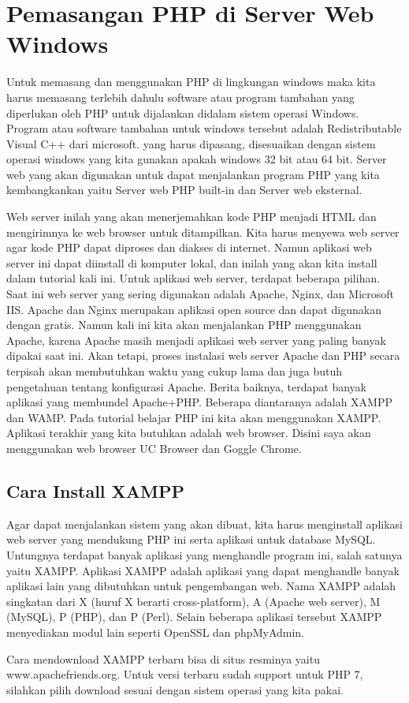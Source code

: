 \section{Pemasangan PHP di Server Web Windows}
Untuk memasang dan menggunakan PHP di lingkungan windows maka kita harus memasang terlebih dahulu software atau program tambahan yang diperlukan oleh PHP untuk dijalankan didalam sistem operasi Windows. Program atau software tambahan untuk windows tersebut adalah Redistributable Visual C++ dari microsoft. yang harus dipasang, disesuaikan dengan sistem operasi windows yang kita gunakan apakah windows 32 bit atau 64 bit. Server web yang akan digunakan untuk dapat menjalankan program PHP yang kita kembangkankan yaitu Server web PHP built-in dan Server web eksternal. 
\par
Web server inilah yang akan menerjemahkan kode PHP menjadi HTML dan mengirimnya ke web browser untuk ditampilkan. Kita harus menyewa web server agar kode PHP dapat diproses dan diakses di internet. Namun aplikasi web server ini dapat diinstall di komputer lokal, dan inilah yang akan kita install dalam tutorial kali ini. Untuk aplikasi web server, terdapat beberapa pilihan. Saat ini web server yang sering digunakan adalah Apache, Nginx, dan Microsoft IIS. Apache dan Nginx merupakan aplikasi open source dan dapat digunakan dengan gratis. Namun kali ini kita akan menjalankan PHP menggunakan Apache, karena Apache masih menjadi aplikasi web server yang paling banyak dipakai saat ini. Akan tetapi, proses instalasi web server Apache dan PHP secara terpisah akan membutuhkan waktu yang cukup lama dan juga butuh pengetahuan tentang konfigurasi Apache. Berita baiknya, terdapat banyak aplikasi yang membundel Apache+PHP. Beberapa diantaranya adalah XAMPP dan WAMP. Pada tutorial belajar PHP ini kita akan menggunakan XAMPP. Aplikasi terakhir yang kita butuhkan adalah web browser. Disini saya akan menggunakan web browser UC Browser dan Goggle Chrome.

\subsection{Cara Install XAMPP}
Agar dapat menjalankan sistem yang akan dibuat, kita harus menginstall aplikasi web server yang mendukung PHP ini serta aplikasi untuk database MySQL. Untungnya terdapat banyak aplikasi yang menghandle program ini, salah satunya yaitu XAMPP. Aplikasi XAMPP adalah aplikasi yang dapat menghandle banyak aplikasi lain yang dibutuhkan untuk pengembangan web. Nama XAMPP adalah singkatan dari X (huruf X berarti cross-platform), A (Apache web server), M (MySQL), P (PHP), dan P (Perl). Selain beberapa aplikasi tersebut XAMPP menyediakan modul lain seperti OpenSSL dan phpMyAdmin.
\par
Cara mendownload XAMPP terbaru bisa di situs resminya yaitu www.apachefriends.org. Untuk versi terbaru sudah support untuk PHP 7, silahkan pilih download sesuai dengan sistem operasi yang kita pakai.

